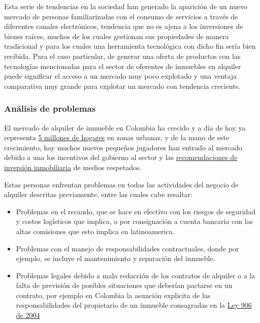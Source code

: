 \documentclass[letterpaper]{article}
\begin{document}
Esta serie de tendencias en la sociedad han generado la aparición de un nuevo mercado de personas familiarizadas con el consumo de servicios a través de diferentes canales electrónicos, tendencia que no es ajena a los inversiones de bienes raíces, muchos de los cuales gestionan sus propiedades de manera tradicional y para los cuales una herramienta tecnológica con dicho fin sería bien recibida. Para el caso particular, de generar una oferta de productos con las tecnologías mencionadas para el sector de oferentes de inmuebles en alquiler puede significar el acceso a un mercado muy poco explotado y una ventaja comparativa muy grande para explotar un mercado con tendencia creciente.


\subsubsection{Análisis de problemas}

El mercado de alquiler de inmueble en Colombia ha crecido y a día de hoy ya representa \href{https://www.portafolio.co/mis-finanzas/vivienda/arriendos-en-estratos-1-2-y-3-los-que-mas-han-subido-en-el-pais-526155}{5 millones de hogares} en zonas urbanas, y de la mano de este crecimiento, hay muchos nuevos pequeños jugadores han entrado al mercado debido a una los incentivos del gobierno al sector y las \href{https://www.portafolio.co/mis-finanzas/vivienda/arriendos-en-estratos-1-2-y-3-los-que-mas-han-subido-en-el-pais-526155}{recomendaciones de inversión inmobiliaria} de medios respetados.

Estas personas enfrentan problemas en todas las actividades del negocio de alquiler descritas previamente, entre las cuales cabe resaltar:

\begin{itemize}
    \item Problemas en el recaudo, que se hace en efectivo con los riesgos de seguridad y costos logísticos que implica, o por consignación a cuenta bancaria con las altas comisiones que esto implica en latinoamerica.
    \item Problemas con el manejo de responsabilidades contractuales, donde por ejemplo, se incluye el mantenimiento y reparación del inmueble.
    \item Problemas legales debido a mala redacción de los contratos de alquiler o a la falta de previsión de posibles situaciones que deberían pactarse en un contrato, por ejemplo en Colombia la asunción explicita de las responsabilidades del propietario de un inmueble consagradas en la \href{https://www.defensoria.gov.co/public/Normograma\%202013_html/Normas/Ley_906_2004.pdf}{Ley 906 de 2004}
\end{itemize}
\end{document}
